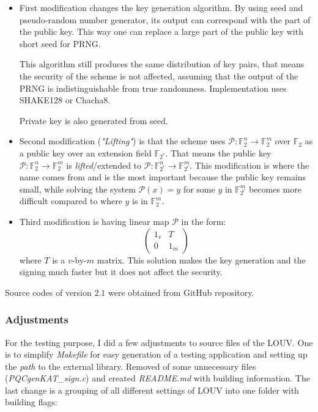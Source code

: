 \documentclass[thesis=M,english]{FITthesis}[2019/12/23]
\begin{document}
\begin{itemize}
\item	First modification changes the key generation algorithm. By using seed and pseudo-random number generator, its output can correspond with the part of the public key. This way one can replace a large part of the public key with short seed for PRNG.

This algorithm still produces the same distribution of key pairs, that means the security of the scheme is not affected, assuming that the output of the PRNG is indistinguishable from true randomness. Implementation uses SHAKE128 or Chacha8.

Private key is also generated from seed.

\item	Second modification (\textit{"Lifting"}) is that the scheme uses $\mathcal{P}:\mathbb{F}_2^n \rightarrow \mathbb{F}_2^m$ over $\mathbb{F}_2$ as a public key over an extension field $\mathbb{F}_{2^r}$. That means the public key $\mathcal{P}:\mathbb{F}_2^n \rightarrow \mathbb{F}_2^m$ is \textit{lifted}/extended to $\mathcal{P}:\mathbb{F}_{2^r}^n \rightarrow \mathbb{F}_{2^r}^m$. This modification is where the name comes from and is the most important because the public key remains small, while solving the system $\mathcal{P}(x) = y$ for some $y$ in $\mathbb{F}_{2^r}^m$ becomes more difficult compared to where $y$ is in $\mathbb{F}_{2}^m$.\cite{L-LIFTING}

\item	Third modification is having linear map $\mathcal{P}$ in the form:
\begin{equation*}
\begin{pmatrix}
1_v & T\\
0 & 1_m
\end{pmatrix}
\end{equation*}
where $T$ is a $v$-by-$m$ matrix. This solution makes the key generation and the signing much faster\cite{L-CZYP} but it does not affect the security.\cite{L-EQ-KEYS}
\end{itemize}

Source codes of version $2.1$ were obtained from GitHub repository.

\subsubsection{Adjustments}
For the testing purpose, I did a few adjustments to source files of the LOUV. One is to simplify \textit{Makefile} for easy generation of a testing application and setting up the \textit{path} to the external library. Removed of some unnecessary files (\textit{PQCgenKAT\_sign.c}) and created \textit{README.md} with building information. The last change is a grouping of all different settings of LOUV into one folder with building flags:
\end{document}
